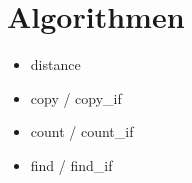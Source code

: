 \section{Algorithmen}
\begin{itemize}
\item distance
\item copy / copy\_if
\item count / count\_if
\item \label{find} find / find\_if
\end{itemize}
